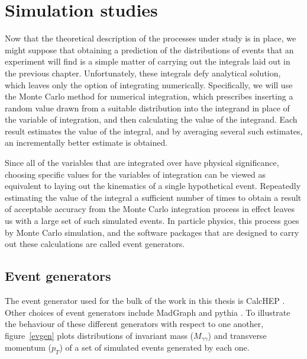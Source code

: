 \chapter{Simulation studies}\label{ch.mc}

Now that the theoretical description of the processes under study is in place, we might suppose that obtaining a prediction of the distributions of events that an experiment will find is a simple matter of carrying out the integrals laid out in the previous chapter. Unfortunately, these integrals defy analytical solution, which leaves only the option of integrating numerically. Specifically, we will use the Monte Carlo method for numerical integration, which prescribes inserting a random value drawn from a suitable distribution into the integrand in place of the variable of integration, and then calculating the value of the integrand. Each result estimates the value of the integral, and by averaging several such estimates, an incrementally better estimate is obtained.

Since all of the variables that are integrated over have physical significance, choosing specific values for the variables of integration can be viewed as equivalent to laying out the kinematics of a single hypothetical event. Repeatedly estimating the value of the integral a sufficient number of times to obtain a result of acceptable accuracy from the Monte Carlo integration process in effect leaves us with a large set of such simulated events. In particle physics, this process goes by Monte Carlo simulation, and the software packages that are designed to carry out these calculations are called event generators.

\section{Event generators}

The event generator used for the bulk of the work in this thesis is CalcHEP \cite{calchep}. Other choices of event generators include MadGraph \cite{madgraph5} and pythia \cite{pythia}. To illustrate the behaviour of these different generators with respect to one another, figure~\ref{evgen} plots distributions of invariant mass ($M_{\gamma\gamma}$) and transverse momentum ($p_T$) of a set of simulated events generated by each one.

